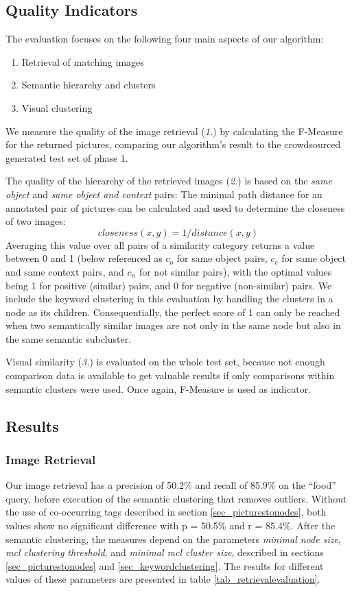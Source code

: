 \subsection{Quality Indicators}
The evaluation focuses on the following four main aspects of our algorithm:
\begin{enumerate}
\item Retrieval of matching images
\item Semantic hierarchy and clusters
\item Visual clustering
\end{enumerate}

We measure the quality of the image retrieval (\emph{1.}) by calculating the F-Measure for the returned pictures, comparing our algorithm's result to the crowdsourced generated test set of phase 1. 

The quality of the hierarchy of the retrieved images (\emph{2.}) is based on the \emph{same object} and \emph{same object and context} pairs: The  minimal path distance for an annotated pair of pictures can be calculated and used to determine the closeness of two images: \[closeness(x,y) = 1/distance(x,y)\] Averaging this value over all pairs of a similarity category returns a value between 0 and 1 (below referenced as $c_o$ for same object pairs, $c_c$ for same object and same context pairs, and $c_n$ for not similar pairs), with the optimal values being 1 for positive (similar) pairs, and 0 for negative (non-similar) pairs. 
We include the keyword clustering in this evaluation by handling the clusters in a node as its children. Consequentially, the perfect score of 1 can only be reached when two semantically similar images are not only in the same node but also in the same semantic subcluster.

Visual similarity (\emph{3.}) is evaluated on the whole test set, because not enough comparison data is available to get valuable results if only comparisons within semantic clusters were used. Once again, F-Measure is used as indicator.

\subsection{Results}
\label{sec_results}

\subsubsection*{Image Retrieval}

Our image retrieval has a precision of 50.2\% and recall of 85.9\% on the ``food'' query, before execution of the semantic clustering that removes outliers. Without the use of co-occurring tags described in section \ref{sec_picturestonodes}, both values show no significant difference with p = 50.5\% and r = 85.4\%.
After the semantic clustering, the measures depend on the  parameters \emph{minimal node size}, \emph{mcl clustering threshold}, and \emph{minimal mcl cluster size}, described in sections \ref{sec_picturestonodes} and \ref{sec_keywordclustering}. The results for different values of these parameters are presented in table \ref{tab_retrievalevaluation}.\\

